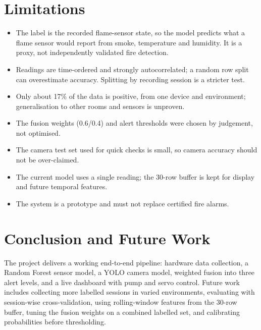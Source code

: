 \documentclass[12pt,a4paper]{article}
\begin{document}
\section{Limitations}
\begin{itemize}
  \item The label is the recorded flame-sensor state, so the model predicts what a flame sensor would report from smoke, temperature and humidity. It is a proxy, not independently validated fire detection.
  \item Readings are time-ordered and strongly autocorrelated; a random row split can overestimate accuracy. Splitting by recording session is a stricter test.
  \item Only about 17\% of the data is positive, from one device and environment; generalisation to other rooms and sensors is unproven.
  \item The fusion weights (0.6/0.4) and alert thresholds were chosen by judgement, not optimised.
  \item The camera test set used for quick checks is small, so camera accuracy should not be over-claimed.
  \item The current model uses a single reading; the 30-row buffer is kept for display and future temporal features.
  \item The system is a prototype and must not replace certified fire alarms.
\end{itemize}

\section{Conclusion and Future Work}
The project delivers a working end-to-end pipeline: hardware data collection, a Random Forest sensor model, a YOLO camera model, weighted fusion into three alert levels, and a live dashboard with pump and servo control. Future work includes collecting more labelled sessions in varied environments, evaluating with session-wise cross-validation, using rolling-window features from the 30-row buffer, tuning the fusion weights on a combined labelled set, and calibrating probabilities before thresholding.

\appendix
\end{document}
